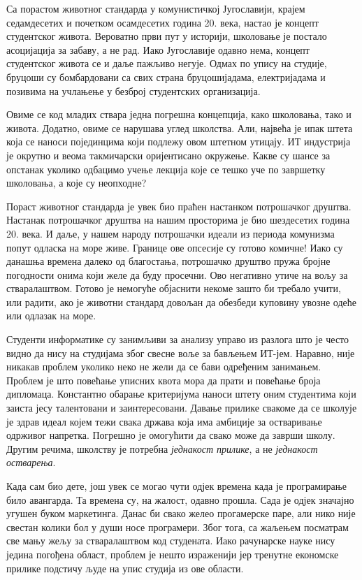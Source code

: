 \documentclass[b5paper]{article}
\begin{document}
Са порастом животног стандарда у комунистичкој Југославији, крајем седамдесетих и почетком осамдесетих година 20. века, настао је концепт студентског живота. Вероватно први пут у историји, школовање је постало асоцијација за забаву, а не рад. Иако Југославије одавно нема, концепт студентског живота се и даље пажљиво негује. Одмах по упису на студије, бруцоши су бомбардовани са свих страна бруцошијадама, електријадама и позивима на учлањење у безброј студентских организација.

Овиме се код младих ствара једна погрешна концепција, како школовања, тако и живота. Додатно, овиме се нарушава углед школства. Али, највећа је ипак штета која се наноси појединцима који подлежу овом штетном утицају. ИТ индустрија је окрутно и веома такмичарски оријентисано окружење. Какве су шансе за опстанак уколико одбацимо учење лекција које се тешко уче по завршетку школовања, а које су неопходне?

Пораст животног стандарда је увек био праћен настанком потрошачког друштва. Настанак потрошачког друштва на нашим просторима је био шездесетих година 20. века. И даље, у нашем народу потрошачки идеали из периода комунизма попут одласка на море живе. Границе ове опсесије су готово комичне! Иако су данашња времена далеко од благостања, потрошачко друштво пружа бројне погодности онима који желе да буду просечни. Ово негативно утиче на вољу за стваралаштвом. Готово је немогуће објаснити некоме зашто би требало учити, или радити, ако је животни стандард довољан да обезбеди куповину увозне одеће или одлазак на море.

Студенти информатике су занимљиви за анализу управо из разлога што је често видно да нису на студијама због свесне воље за бављењем ИТ-јем. Наравно, није никакав проблем уколико неко не жели да се бави одређеним занимањем. Проблем је што повећање уписних квота мора да прати и повећање броја дипломаца. Константно обарање критеријума наноси штету оним студентима који заиста јесу талентовани и заинтересовани. Давање прилике свакоме да се школује је здрав идеал којем тежи свака држава која има амбиције за остваривање одрживог напретка. Погрешно је омогућити да свако може да заврши школу. Другим речима, школству је потребна \textit{једнакост прилике}, а не \textit{једнакост остварења}.

Када сам био дете, још увек се могао чути одјек времена када је програмирање било авангарда. Та времена су, на жалост, одавно прошла. Сада је одјек значајно угушен буком маркетинга. Данас би свако желео прогамерске паре, али нико није свестан колики бол у души носе програмери. Због тога, са жаљењем посматрам све мању жељу за стваралаштвом код студената. Иако рачунарске науке нису једина погођена област, проблем је нешто израженији јер тренутне економске прилике подстичу људе на упис студија из ове области.
\end{document}
